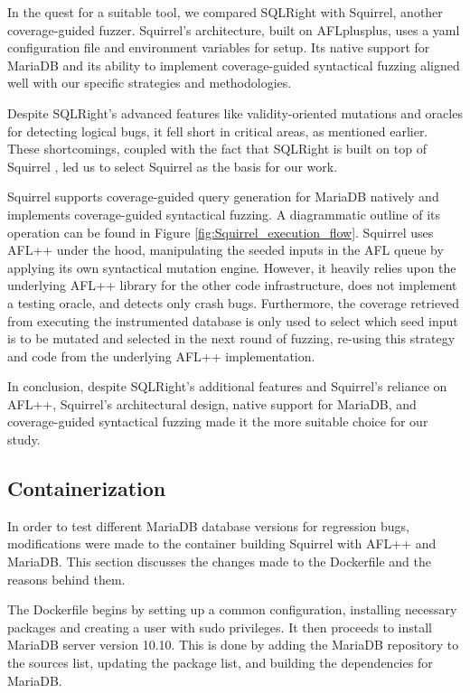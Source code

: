 \documentclass[sigconf]{acmart}
\begin{document}

In the quest for a suitable tool, we compared SQLRight with Squirrel, another coverage-guided fuzzer. Squirrel's architecture, built on AFLplusplus, uses a yaml configuration file and environment variables for setup. Its native support for MariaDB and its ability to implement coverage-guided syntactical fuzzing aligned well with our specific strategies and methodologies.

Despite SQLRight's advanced features like validity-oriented mutations and oracles for detecting logical bugs, it fell short in critical areas, as mentioned earlier. These shortcomings, coupled with the fact that SQLRight is built on top of Squirrel \cite{zhong2020squirrel}, led us to select Squirrel as the basis for our work.

Squirrel supports coverage-guided query generation for MariaDB natively and implements coverage-guided syntactical fuzzing. A diagrammatic outline of its operation can be found in Figure \ref{fig:Squirrel_execution_flow}. Squirrel uses AFL++ under the hood, manipulating the seeded inputs in the AFL queue by applying its own syntactical mutation engine. However, it heavily relies upon the underlying AFL++ library for the other code infrastructure, does not implement a testing oracle, and detects only crash bugs. Furthermore, the coverage retrieved from executing the instrumented database is only used to select which seed input is to be mutated and selected in the next round of fuzzing, re-using this strategy and code from the underlying AFL++ implementation.

In conclusion, despite SQLRight's additional features and Squirrel's reliance on AFL++, Squirrel's architectural design, native support for MariaDB, and coverage-guided syntactical fuzzing made it the more suitable choice for our study.

\subsection{Containerization}

In order to test different MariaDB database versions for regression bugs, modifications were made to the container building Squirrel with AFL++ and MariaDB. This section discusses the changes made to the Dockerfile and the reasons behind them.

The Dockerfile begins by setting up a common configuration, installing necessary packages and creating a user with sudo privileges. It then proceeds to install MariaDB server version 10.10. This is done by adding the MariaDB repository to the sources list, updating the package list, and building the dependencies for MariaDB.
\end{document}
